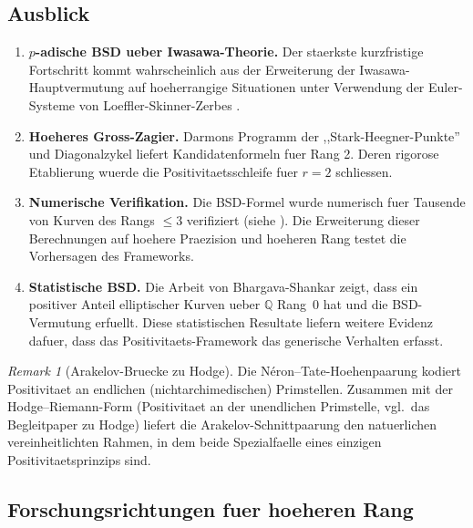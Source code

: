 \documentclass[aps,prd,twocolumn,superscriptaddress,nofootinbib]{revtex4-2}
\theoremstyle{definition}
\theoremstyle{remark}
\newtheorem{remark}[theorem]{Remark}
\begin{document}
\subsection{Ausblick}

\begin{enumerate}
\item \textbf{$p$-adische BSD ueber Iwasawa-Theorie.} Der staerkste kurzfristige Fortschritt kommt wahrscheinlich aus der Erweiterung der Iwasawa-Hauptvermutung auf hoeherrangige Situationen unter Verwendung der Euler-Systeme von Loeffler-Skinner-Zerbes \cite{LSZ2020}.

\item \textbf{Hoeheres Gross-Zagier.} Darmons Programm der ,,Stark-Heegner-Punkte'' und Diagonalzykel liefert Kandidatenformeln fuer Rang 2. Deren rigorose Etablierung wuerde die Positivitaetsschleife fuer $r = 2$ schliessen.

\item \textbf{Numerische Verifikation.} Die BSD-Formel wurde numerisch fuer Tausende von Kurven des Rangs $\leq 3$ verifiziert (siehe \cite{LMFDB}). Die Erweiterung dieser Berechnungen auf hoehere Praezision und hoeheren Rang testet die Vorhersagen des Frameworks.

\item \textbf{Statistische BSD.} Die Arbeit von Bhargava-Shankar \cite{BhargavaShankar2015} zeigt, dass ein positiver Anteil elliptischer Kurven ueber $\mathbb{Q}$ Rang~0 hat und die BSD-Vermutung erfuellt. Diese statistischen Resultate liefern weitere Evidenz dafuer, dass das Positivitaets-Framework das generische Verhalten erfasst.
\end{enumerate}


\begin{remark}[Arakelov-Bruecke zu Hodge]
\label{rem:arakelov-bridge}
Die N\'eron--Tate-Hoehenpaarung kodiert Positivitaet an endlichen (nichtarchimedischen) Primstellen. Zusammen mit der Hodge--Riemann-Form (Positivitaet an der unendlichen Primstelle, vgl.\ das Begleitpaper zu Hodge) liefert die Arakelov-Schnittpaarung den natuerlichen vereinheitlichten Rahmen, in dem beide Spezialfaelle eines einzigen Positivitaetsprinzips sind.
\end{remark}


\subsection{Forschungsrichtungen fuer hoeheren Rang}
\label{sec:higher_rank_directions}
\end{document}
